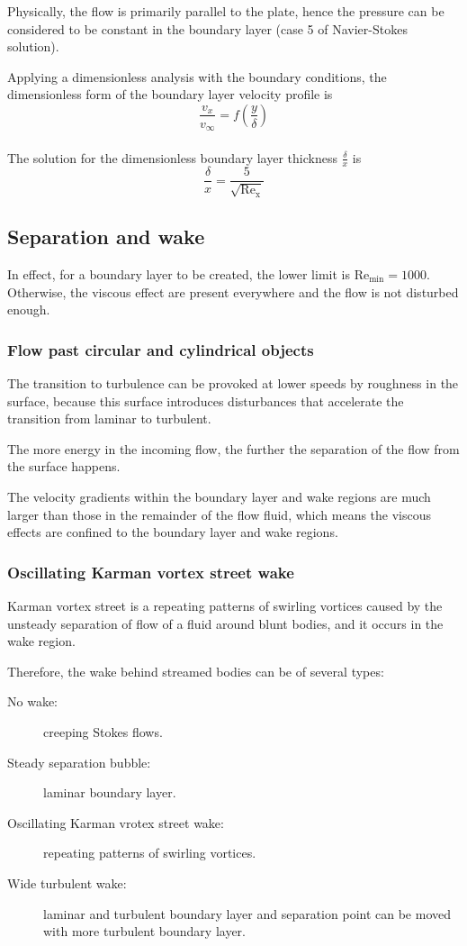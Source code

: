 \documentclass[10pt, twocolumn]{article}
\begin{document}
Physically, the flow is primarily parallel to the plate, hence the pressure can be considered to be constant in the boundary layer (case 5 of Navier-Stokes solution).

Applying a dimensionless analysis with the boundary conditions, the dimensionless form of the boundary layer velocity profile is
\[
  \frac{v_x}{v_\infty} = f\left( \frac{y}{\delta} \right)
\]
\[
  \begin{array}{|l}
  \end{array}
\]

The solution for the dimensionless boundary layer thickness \(\frac{\delta}{x}\) is
\[
  \frac{\delta}{x} = \frac{5}{\sqrt{\mathrm{Re_x}}}
\]


\subsection{Separation and wake}
In effect, for a boundary layer to be created, the lower limit is \(\mathrm{Re}_\mathrm{min} = 1000\).
Otherwise, the viscous effect are present everywhere and the flow is not disturbed enough.


\subsubsection{Flow past circular and cylindrical objects}
The transition to turbulence can be provoked at lower speeds by roughness in the surface, because this surface introduces disturbances that accelerate the transition from laminar to turbulent.

The more energy in the incoming flow, the further the separation of the flow from the surface happens.

The velocity gradients within the boundary layer and wake regions are much larger than those in the remainder of the flow fluid, which means the viscous effects are confined to the boundary layer and wake regions.


\subsubsection{Oscillating Karman vortex street wake}
Karman vortex street is a repeating patterns of swirling vortices caused by the unsteady separation of flow of a fluid around blunt bodies, and it occurs in the wake region.

Therefore, the wake behind streamed bodies can be of several types:
\begin{description}
  \item[No wake:] creeping Stokes flows.
  \item[Steady separation bubble:] laminar boundary layer.
  \item[Oscillating Karman vrotex street wake:] repeating patterns of swirling vortices.
  \item[Wide turbulent wake:] laminar and turbulent boundary layer and separation point can be moved with more turbulent boundary layer.
\end{description}
\end{document}
